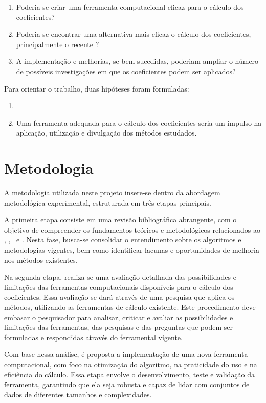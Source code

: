 \begin{enumerate}
    \label{enum:quest}
    \item Poderia-se criar uma ferramenta computacional eficaz para o cálculo dos coeficientes?
    \item Poderia-se encontrar uma alternativa mais eficaz o cálculo dos coeficientes, principalmente o recente \dmc?
    \item A implementação e melhorias, se bem sucedidas, poderiam ampliar o número de possíveis investigações em que os coeficientes podem ser aplicados?
\end{enumerate}

Para orientar o trabalho, duas hipóteses foram formuladas:

\begin{enumerate}
    \item 
	\item Uma ferramenta adequada para o cálculo dos coeficientes seria um impulso na aplicação, utilização e divulgação dos métodos estudados.
\end{enumerate}

\section{Metodologia}
\label{sec:metodologia}

A metodologia utilizada neste projeto insere-se dentro da abordagem metodológica experimental, estruturada em três etapas principais.

A primeira etapa consiste em uma revisão bibliográfica abrangente, com o objetivo de compreender os fundamentos teóricos e metodológicos relacionados ao \dfa, \dcca, \pdcca~e \dmc. Nesta fase, busca-se consolidar o entendimento sobre os algoritmos e metodologias vigentes, bem como identificar lacunas e oportunidades de melhoria nos métodos existentes.

Na segunda etapa, realiza-se uma avaliação detalhada das possibilidades e limitações das ferramentas computacionais disponíveis para o cálculo dos coeficientes. Essa avaliação se dará através de uma pesquisa que aplica os métodos, utilizando as ferramentas de cálculo existente. Este procedimento deve embasar o pesquisador para analisar, criticar e avaliar as possibilidades e limitações das ferramentas, das pesquisas e das preguntas que podem ser formuladas e respondidas através do ferramental vigente.

Com base nessa análise, é proposta a implementação de uma nova ferramenta computacional, com foco na otimização do algoritmo, na praticidade do uso e na eficiência do cálculo. Essa etapa envolve o desenvolvimento, teste e validação da ferramenta, garantindo que ela seja robusta e capaz de lidar com conjuntos de dados de diferentes tamanhos e complexidades.

